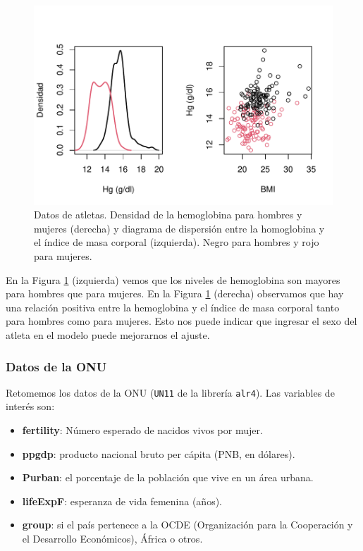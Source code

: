 \documentclass[
]{article}
\providecommand{\tightlist}{%
  \setlength{\itemsep}{0pt}\setlength{\parskip}{0pt}}
\begin{document}
\begin{figure}

{\centering \includegraphics{MLG2_files/figure-latex/AtletesFigure-1} 

}

\caption{Datos de atletas. Densidad de la hemoglobina para hombres y mujeres (derecha) y diagrama de dispersión entre la homoglobina y el índice de masa corporal (izquierda). Negro para hombres y rojo para mujeres.}\label{fig:AtletesFigure}
\end{figure}

En la Figura \ref{fig:AtletesFigure} (izquierda) vemos que los niveles de hemoglobina son mayores para hombres que para mujeres. En la Figura \ref{fig:AtletesFigure} (derecha) observamos que hay una relación positiva entre la hemoglobina y el índice de masa corporal tanto para hombres como para mujeres. Esto nos puede indicar que ingresar el sexo del atleta en el modelo puede mejorarnos el ajuste.

\hypertarget{datos-de-la-onu}{%
\subsubsection{Datos de la ONU}\label{datos-de-la-onu}}

Retomemos los datos de la ONU (\texttt{UN11} de la librería \texttt{alr4}). Las variables de interés son:

\begin{itemize}
\tightlist
\item
  \textbf{fertility}: Número esperado de nacidos vivos por mujer.
\item
  \textbf{ppgdp}: producto nacional bruto per cápita (PNB, en dólares).
\item
  \textbf{Purban}: el porcentaje de la población que vive en un área urbana.
\item
  \textbf{lifeExpF}: esperanza de vida femenina (años).
\item
  \textbf{group}: si el país pertenece a la OCDE (Organización para la Cooperación y el Desarrollo Económicos), África o otros.
\end{itemize}
\end{document}
